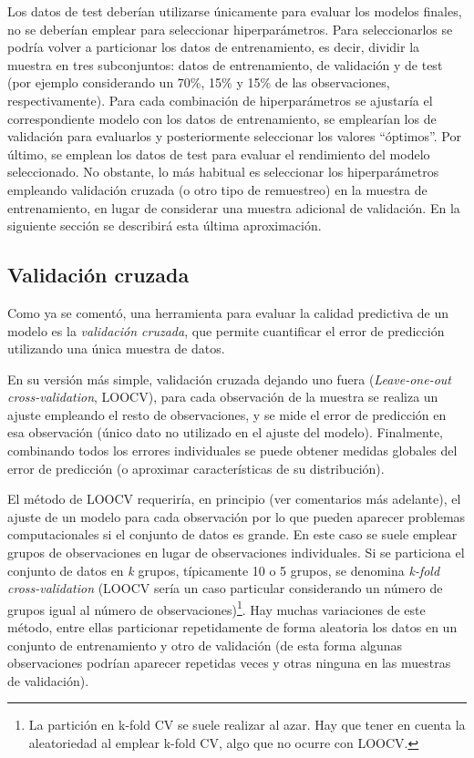 \documentclass[
  spanish,
]{book}
\theoremstyle{break}
\theoremstyle{definition}
\theoremstyle{definition}
\theoremstyle{definition}
\theoremstyle{definition}
\theoremstyle{remark}
\begin{document}
Los datos de test deberían utilizarse únicamente para evaluar los modelos finales, no se deberían emplear para seleccionar hiperparámetros.
Para seleccionarlos se podría volver a particionar los datos de entrenamiento, es decir, dividir la muestra en tres subconjuntos: datos de entrenamiento, de validación y de test (por ejemplo considerando un 70\%, 15\% y 15\% de las observaciones, respectivamente).
Para cada combinación de hiperparámetros se ajustaría el correspondiente modelo con los datos de entrenamiento, se emplearían los de validación para evaluarlos y posteriormente seleccionar los valores ``óptimos''. Por último, se emplean los datos de test para evaluar el rendimiento del modelo seleccionado.
No obstante, lo más habitual es seleccionar los hiperparámetros empleando validación cruzada (o otro tipo de remuestreo) en la muestra de entrenamiento, en lugar de considerar una muestra adicional de validación.
En la siguiente sección se describirá esta última aproximación.

\hypertarget{cv}{%
\subsection{Validación cruzada}\label{cv}}

Como ya se comentó, una herramienta para evaluar la calidad predictiva de un modelo es la \emph{validación cruzada}, que permite cuantificar el error de predicción utilizando una única muestra de datos.

En su versión más simple, validación cruzada dejando uno fuera (\emph{Leave-one-out cross-validation}, LOOCV), para cada observación de la muestra se realiza un ajuste empleando el resto de observaciones, y se mide el error de predicción en esa observación (único dato no utilizado en el ajuste del modelo).
Finalmente, combinando todos los errores individuales se puede obtener medidas globales del error de predicción (o aproximar características de su distribución).

El método de LOOCV requeriría, en principio (ver comentarios más adelante), el ajuste de un modelo para cada observación por lo que pueden aparecer problemas computacionales si el conjunto de datos es grande.
En este caso se suele emplear grupos de observaciones en lugar de observaciones individuales.
Si se particiona el conjunto de datos en \emph{k} grupos, típicamente 10 o 5 grupos, se denomina \emph{k-fold cross-validation} (LOOCV sería un caso particular considerando un número de grupos igual al número de observaciones)\footnote{La partición en k-fold CV se suele realizar al azar. Hay que tener en cuenta la aleatoriedad al emplear k-fold CV, algo que no ocurre con LOOCV.}.
Hay muchas variaciones de este método, entre ellas particionar repetidamente de forma aleatoria los datos en un conjunto de entrenamiento y otro de validación (de esta forma algunas observaciones podrían aparecer repetidas veces y otras ninguna en las muestras de validación).
\end{document}
